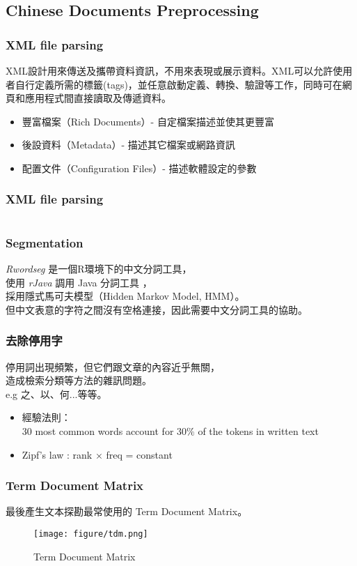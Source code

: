 \documentclass{beamer}
\begin{document}
\subsection{Chinese Documents Preprocessing}
\begin{frame}
	\frametitle{XML file parsing}
	XML設計用來傳送及攜帶資料資訊，不用來表現或展示資料。XML可以允許使用者自行定義所需的標籤(tags)，並任意啟動定義、轉換、驗證等工作，同時可在網頁和應用程式間直接讀取及傳遞資料。
	    \begin{itemize}
	        \item 豐富檔案（Rich Documents）- 自定檔案描述並使其更豐富
	        \item 後設資料（Metadata）- 描述其它檔案或網路資訊
	        \item 配置文件（Configuration Files）- 描述軟體設定的參數
	    \end{itemize}
\end{frame}

\begin{frame}
\frametitle{XML file parsing}
\inputminted{r}{code/xml_parsing.r}
\end{frame}

\begin{frame}
    \frametitle{Segmentation}
        \textit{Rwordseg} 是一個R環境下的中文分詞工具，\\使用 \textit{rJava} 調用 Java 分詞工具 ，\\採用隱式馬可夫模型（Hidden Markov Model, HMM）。\\但中文表意的字符之間沒有空格連接，因此需要中文分詞工具的協助。
\end{frame}

\begin{frame}
    \frametitle{去除停用字}
    停用詞出現頻繁，但它們跟文章的內容近乎無關，\\
    造成檢索分類等方法的雜訊問題。\\
    e.g 之、以、何...等等。
    \begin{itemize}
        \item 經驗法則：\\$30$ most common words account for $30\%$ of the tokens in written text
        \item Zipf's law : rank × freq = constant
    \end{itemize}
\end{frame}

\begin{frame}
    \frametitle{Term Document Matrix}
    最後產生文本探勘最常使用的 Term Document Matrix。
    \begin{figure}[H]
    	\begin{center}
        	\texttt{[image: figure/tdm.png]}
			\caption{Term Document Matrix}
    	\end{center}
	\end{figure}
\end{frame}
\end{document}
